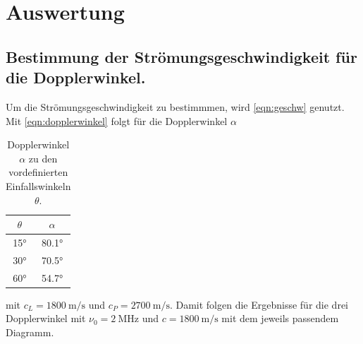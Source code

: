 \documentclass[
  bibliography=totoc,     %
  captions=tableheading,  %
  titlepage=firstiscover, %
]{scrartcl}
\begin{document}
\section{Auswertung}
\subsection{Bestimmung der Strömungsgeschwindigkeit für die Dopplerwinkel.}
Um die Strömungsgeschwindigkeit zu bestimmmen, wird \eqref{eqn:geschw} genutzt.
Mit \eqref{eqn:dopplerwinkel} folgt für die Dopplerwinkel $\alpha$
\begin{table}
  \centering
  \begin{tabular}{c c}
    \toprule
    $\theta$ & $\alpha$ \\
    \midrule
    15° & 80.1° \\
    30° & 70.5° \\
    60° & 54.7° \\
    \bottomrule
  \end{tabular}
  \caption{Dopplerwinkel $\alpha$ zu den vordefinierten Einfallswinkeln
  $\theta$.}
  \label{tab:1}
\end{table}
mit $c_L = \SI{1800}{\meter\per\second}$ und $c_P =
\SI{2700}{\meter\per\second}$.
Damit folgen die Ergebnisse für die drei Dopplerwinkel mit $\nu_0 =
\SI{2}{\mega\hertz}$
und $c = \SI{1800}{\meter\per\second}$ mit dem jeweils passendem Diagramm.
\end{document}
